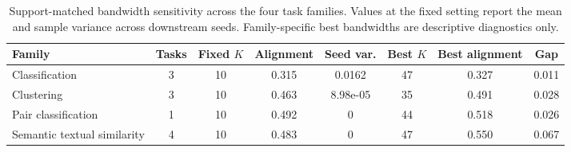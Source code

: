 \begin{table}[t]
\centering
\caption{Support-matched bandwidth sensitivity across the four task families. Values at the fixed setting report the mean and sample variance across downstream seeds. Family-specific best bandwidths are descriptive diagnostics only.}
\label{tab:bandwidth_sensitivity_main}
\footnotesize
\setlength{\tabcolsep}{4.2pt}
\renewcommand{\arraystretch}{1.10}
\begin{tabular*}{\textwidth}{@{\extracolsep{\fill}}lccccccc@{}}
\toprule
\textbf{Family} & \textbf{Tasks} & \textbf{Fixed $K$} & \textbf{Alignment} & \textbf{Seed var.} & \textbf{Best $K$} & \textbf{Best alignment} & \textbf{Gap} \\
\midrule
Classification & 3 & 10 & 0.315 & 0.0162 & 47 & 0.327 & 0.011 \\
Clustering & 3 & 10 & 0.463 & 8.98e-05 & 35 & 0.491 & 0.028 \\
Pair classification & 1 & 10 & 0.492 & 0 & 44 & 0.518 & 0.026 \\
Semantic textual similarity & 4 & 10 & 0.483 & 0 & 47 & 0.550 & 0.067 \\
\bottomrule
\end{tabular*}
\end{table}
